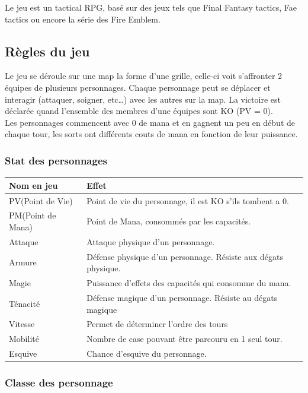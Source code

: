 \documentclass[a4paper,12pt]{article}
\begin{document}
Le jeu est un tactical RPG, basé sur des jeux tels que Final Fantasy
tactics, Fae tactics ou encore la série des Fire Emblem.

\subsection{Règles du jeu}

Le jeu se déroule sur une map la forme d'une grille, celle-ci voit 
s'affronter 2 équipes de plusieurs personnages. Chaque personnage peut se 
déplacer et interagir (attaquer, soigner, etc\dots) avec les autres sur la map.
La victoire est déclarée quand l'ensemble des membres d'une équipes 
sont KO (PV = 0). \\
Les personnages commencent avec 0 de mana et en gagnent un peu en début de chaque tour, les sorts ont différents couts de mana en fonction de leur puissance.

\subsubsection{Stat des personnages}

\begin{tabular}{|l|l|}
  \hline
  Nom en jeu & Effet \\
  \hline
  \hline
  PV(Point de Vie) & Point de vie du personnage, il est KO s'ils tombent a 0.\\
  \hline
  PM(Point de Mana) & Point de Mana, consommés par les capacités. \\
  \hline
  Attaque & Attaque physique d'un personnage. \\
  \hline
  Armure & Défense physique d'un personnage. Résiste aux dégats physique.\\
  \hline 
  Magie & Puissance d'effets des capacités qui consomme du mana. \\
  \hline 
  Ténacité & Défense magique d'un personnage. Résiste au dégats magique \\
  \hline 
  Vitesse & Permet de déterminer l'ordre des tours \\
  \hline
  Mobilité & Nombre de case pouvant être parcouru en 1 seul tour. \\
  \hline
  Esquive & Chance d'esquive du personnage. \\
  \hline
\end{tabular}

\subsubsection{Classe des personnage}
\end{document}
